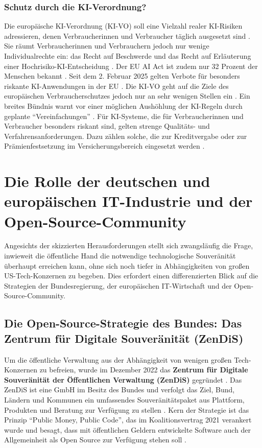 \documentclass[12pt,a4paper]{article}
\begin{document}
	\subsubsection{Schutz durch die KI-Verordnung?}
	
	Die europäische KI-Verordnung (KI-VO) soll eine Vielzahl realer KI-Risiken adressieren, denen Verbraucherinnen und Verbraucher täglich ausgesetzt sind \cite{VZBV2025}. Sie räumt Verbraucherinnen und Verbrauchern jedoch nur wenige Individualrechte ein: das Recht auf Beschwerde und das Recht auf Erläuterung einer Hochrisiko-KI-Entscheidung \cite{VZBV2025}. Der EU AI Act ist zudem nur 32 Prozent der Menschen bekannt \cite{TUEV2025}. Seit dem 2. Februar 2025 gelten Verbote für besonders riskante KI-Anwendungen in der EU \cite{Rechtsanwalt2025}. Die KI-VO geht auf die Ziele des europäischen Verbraucherschutzes jedoch nur an sehr wenigen Stellen ein \cite{CRonline2025}. Ein breites Bündnis warnt vor einer möglichen Aushöhlung der KI-Regeln durch geplante \enquote{Vereinfachungen} \cite{Netzpolitik2026}. Für KI-Systeme, die für Verbraucherinnen und Verbraucher besonders riskant sind, gelten strenge Qualitäts- und Verfahrensanforderungen. Dazu zählen solche, die zur Kreditvergabe oder zur Prämienfestsetzung im Versicherungsbereich eingesetzt werden \cite{BMJV2025}.
	
	\section{Die Rolle der deutschen und europäischen IT-Industrie und der Open-Source-Community}
	
	Angesichts der skizzierten Herausforderungen stellt sich zwangsläufig die Frage, inwieweit die öffentliche Hand die notwendige technologische Souveränität überhaupt erreichen kann, ohne sich noch tiefer in Abhängigkeiten von großen US-Tech-Konzernen zu begeben. Dies erfordert einen differenzierten Blick auf die Strategien der Bundesregierung, der europäischen IT-Wirtschaft und der Open-Source-Community.
	
	\subsection{Die Open-Source-Strategie des Bundes: Das Zentrum für Digitale Souveränität (ZenDiS)}
	
	Um die öffentliche Verwaltung aus der Abhängigkeit von wenigen großen Tech-Konzernen zu befreien, wurde im Dezember 2022 das \textbf{Zentrum für Digitale Souveränität der Öffentlichen Verwaltung (ZenDiS)} gegründet \cite{ZenDiS2025}. Das ZenDiS ist eine GmbH im Besitz des Bundes und verfolgt das Ziel, Bund, Ländern und Kommunen ein umfassendes Souveränitätspaket aus Plattform, Produkten und Beratung zur Verfügung zu stellen \cite{ZenDiS2025}. Kern der Strategie ist das Prinzip \enquote{Public Money, Public Code}, das im Koalitionsvertrag 2021 verankert wurde und besagt, dass mit öffentlichen Geldern entwickelte Software auch der Allgemeinheit als Open Source zur Verfügung stehen soll \cite{SovereignTechFund2025}.
	
\end{document}
